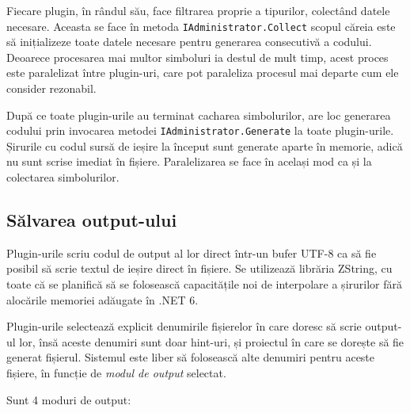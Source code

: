 \documentclass[a4paper,12pt]{report}
\begin{document}
Fiecare plugin, în rândul său, face filtrarea proprie a tipurilor, colectând datele necesare.
Aceasta se face în metoda \texttt{IAdministrator.Collect} scopul căreia este să inițializeze toate datele necesare pentru generarea consecutivă a codului.
Deoarece procesarea mai multor simboluri ia destul de mult timp, acest proces este paralelizat între plugin-uri, care pot paraleliza procesul mai departe cum ele consider rezonabil.

După ce toate plugin-urile au terminat cacharea simbolurilor, are loc generarea codului prin invocarea metodei \texttt{IAdministrator.Generate} la toate plugin-urile.
Șirurile cu codul sursă de ieșire la început sunt generate aparte în memorie, adică nu sunt scrise imediat în fișiere.
Paralelizarea se face în același mod ca și la colectarea simbolurilor.

\subsection{Sălvarea output-ului}

Plugin-urile scriu codul de output al lor direct într-un bufer UTF-8 ca să fie posibil să scrie textul de ieșire direct în fișiere.
Se utilizează librăria ZString\cite{zstring_github}, cu toate că se planifică să se folosească capacitățile noi de interpolare a șirurilor fără alocările memoriei adăugate în {{.}NET 6}.\cite{string_interpolation_csharp_10}

Plugin-urile selectează explicit denumirile fișierelor în care doresc să scrie output-ul lor, însă aceste denumiri sunt doar hint-uri, și proiectul în care se dorește să fie generat fișierul.
Sistemul este liber să folosească alte denumiri pentru aceste fișiere, în funcție de \emph{modul de output} selectat.

Sunt 4 moduri de output:
\end{document}
